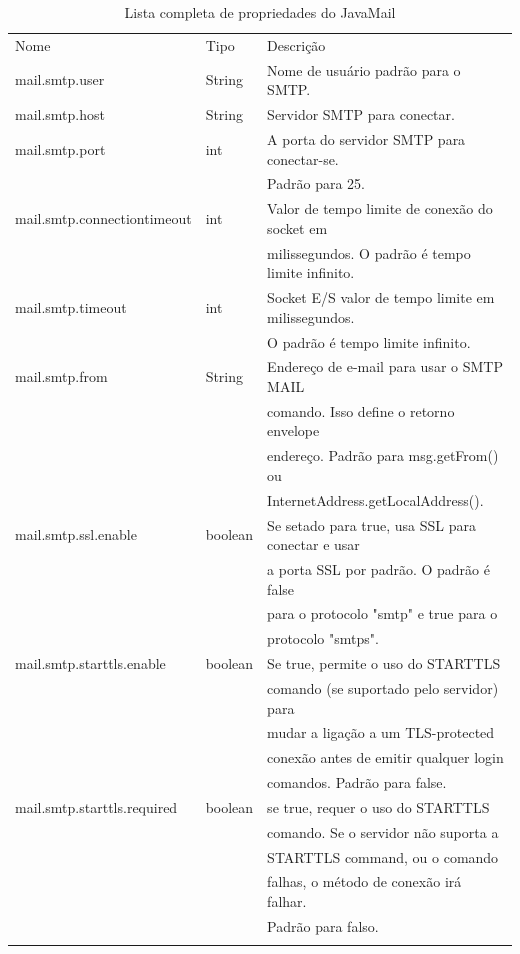 \documentclass[envcountsame,envcountchap,letterpaper]{svmono}
\begin{document}
\begin{table}
\centering
\caption{Lista completa de propriedades do JavaMail}
\label{tab:javamail-properties}
\begin{tabular}{lll}
\hline\noalign{\smallskip}
Nome & Tipo & Descrição  \\
\noalign{\smallskip}\hline\noalign{\smallskip}
mail.smtp.user & String & Nome de usuário padrão para o SMTP. \\
mail.smtp.host & String & Servidor SMTP para conectar. \\
mail.smtp.port & int & A porta do servidor SMTP para conectar-se.\\ & & Padrão para 25. \\
mail.smtp.connectiontimeout & int & Valor de tempo limite de conexão do socket em \\ & & milissegundos. O padrão é tempo limite infinito.\\
mail.smtp.timeout & int & Socket E/S valor de tempo limite em milissegundos. \\ & & O padrão é tempo limite infinito. \\
mail.smtp.from & String & Endereço de e-mail para usar o SMTP MAIL \\ & & comando. Isso define o retorno envelope \\ & & endereço. Padrão para msg.getFrom() ou \\ & & InternetAddress.getLocalAddress(). \\
mail.smtp.ssl.enable & boolean & Se setado para true, usa SSL para conectar e usar \\ & & a porta SSL por padrão. O padrão é false \\ & & para o protocolo "smtp" e true para o \\ & & protocolo "smtps". \\
mail.smtp.starttls.enable & boolean & Se true, permite o uso do STARTTLS\\ & & comando (se suportado pelo servidor) para\\ & & mudar a ligação a um TLS-protected\\ & & conexão antes de emitir qualquer login\\ & & comandos. Padrão para false. \\
mail.smtp.starttls.required & boolean & se true, requer o uso do STARTTLS \\ & & comando. Se o servidor não suporta a \\ & & STARTTLS command, ou o comando \\ & & falhas, o método de conexão irá falhar. \\ & &Padrão para falso. \\
\noalign{\smallskip}\hline
\end{tabular}
\end{table}

\backmatter

\printindex
\end{document}
